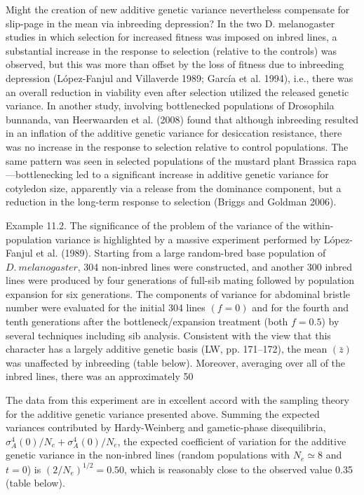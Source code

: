 \documentclass{article}
\begin{document}
Might the creation of new additive genetic variance nevertheless compensate for slip-page in the mean via inbreeding depression? In the two D. melanogaster studies in which selection for increased fitness was imposed on inbred lines, a substantial increase in the response to selection (relative to the controls) was observed, but this was more than offset by the loss of fitness due to inbreeding depression (López-Fanjul and Villaverde 1989; García et al. 1994), i.e., there was an overall reduction in viability even after selection utilized the released genetic variance. In another study, involving bottlenecked populations of Drosophila bunnanda, van Heerwaarden et al. (2008) found that although inbreeding resulted in an inflation of the additive genetic variance for desiccation resistance, there was no increase in the response to selection relative to control populations. The same pattern was seen in selected populations of the mustard plant Brassica rapa—bottlenecking led to a significant increase in additive genetic variance for cotyledon size, apparently via a release from the dominance component, but a reduction in the long-term response to selection (Briggs and Goldman 2006).

Example 11.2. The significance of the problem of the variance of the within-population variance is highlighted by a massive experiment performed by López-Fanjul et al. (1989). Starting from a large random-bred base population of  $ D.\ melanogaster $, 304 non-inbred lines were constructed, and another 300 inbred lines were produced by four generations of full-sib mating followed by population expansion for six generations. The components of variance for abdominal bristle number were evaluated for the initial 304 lines  $ (f = 0) $ and for the fourth and tenth generations after the bottleneck/expansion treatment (both  $ f = 0.5 $) by several techniques including sib analysis. Consistent with the view that this character has a largely additive genetic basis (LW, pp. 171–172), the mean  $ (\bar{z}) $ was unaffected by inbreeding (table below). Moreover, averaging over all of the inbred lines, there was an approximately 50%

The data from this experiment are in excellent accord with the sampling theory for the additive genetic variance presented above. Summing the expected variances contributed by Hardy-Weinberg and gametic-phase disequilibria,  $ \sigma_A^4(0)/N_e + \sigma_A^4(0)/N_e $, the expected coefficient of variation for the additive genetic variance in the non-inbred lines (random populations with  $ N_e \simeq 8 $ and  $ t = 0 $) is  $ (2/N_e)^{1/2} = 0.50 $, which is reasonably close to the observed value 0.35 (table below).
\end{document}
